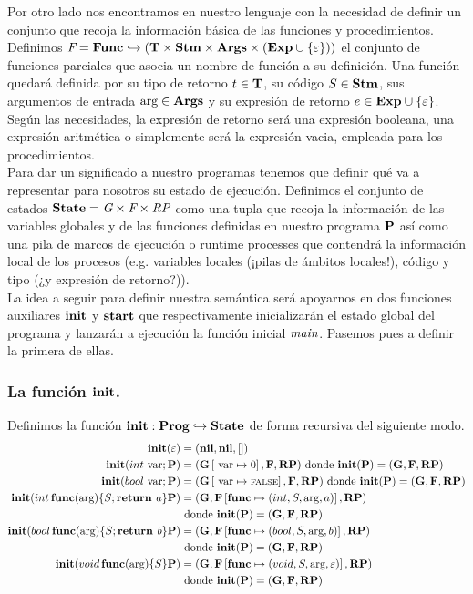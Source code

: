 Por otro lado nos encontramos en nuestro lenguaje con la necesidad de definir un conjunto que recoja la información básica de las funciones y procedimientos. Definimos $\Fs = \Func \hookrightarrow (\T \times \Stm \times \Args \times (\Exp \cup \{\varepsilon\}))$ el conjunto de funciones parciales que asocia un nombre de función a su definición. Una función quedará definida por su tipo de retorno $t \in \T$, su código $S \in \Stm$, sus argumentos de entrada $\args \in \Args$ y su expresión de retorno $e \in \Exp \cup \{\varepsilon\}$. Según las necesidades, la expresión de retorno será una expresión booleana, una expresión aritmética o simplemente será la expresión vacia, empleada para los procedimientos.\\

Para dar un significado a nuestro programas tenemos que definir qué va a representar para nosotros su estado de ejecución. Definimos el conjunto de estados $\State = \Gs \times \Fs \times \RPs$ como una tupla que recoja la información de las variables globales y de las funciones definidas en nuestro programa $\P$ así como una pila de marcos de ejecución o runtime processes que contendrá la información local de los procesos (e.g. variables locales (¡pilas de ámbitos locales!), código y tipo (¿y expresión de retorno?)).\\

La idea a seguir para definir nuestra semántica será apoyarnos en dos funciones auxiliares $\init$ y $\start$ que respectivamente inicializarán el estado global del programa y lanzarán a ejecución la función inicial $\main$. Pasemos pues a definir la primera de ellas.

\subsubsection{La función $\init$.}
Definimos la función $\init: \Prog \hookrightarrow \State$ de forma recursiva del siguiente modo.
\begin{align*}
  \init(\varepsilon) &= (\nil, \nil, [])\\
  \init(int \var \; \P) &= (\G\ass{\var}{0}, \F, \RP) \text{ donde } \init(\P) = (\G, \F, \RP)\\
  \init(bool \var \; \P) &= (\G\ass{\var}{\False}, \F, \RP) \text{ donde } \init(\P) = (\G, \F, \RP)\\
  \init(int \, \func(\args) \{ S\; \return a\} \P) &= (\G, \F\ass{\func}{(int, S, \args, a)}, \RP) \\ &\text{ donde } \init(\P) = (\G, \F, \RP)\\
  \init(bool \, \func(\args) \{ S\; \return b\} \P) &= (\G, \F\ass{\func}{(bool, S, \args, b)}, \RP) \\ &\text{ donde } \init(\P) = (\G, \F, \RP)\\
  \init(void \, \func(\args) \{ S\} \P) &= (\G, \F\ass{\func}{(void, S, \args, \varepsilon)}, \RP) \\ &\text{ donde } \init(\P) = (\G, \F, \RP)\\
\end{align*}
